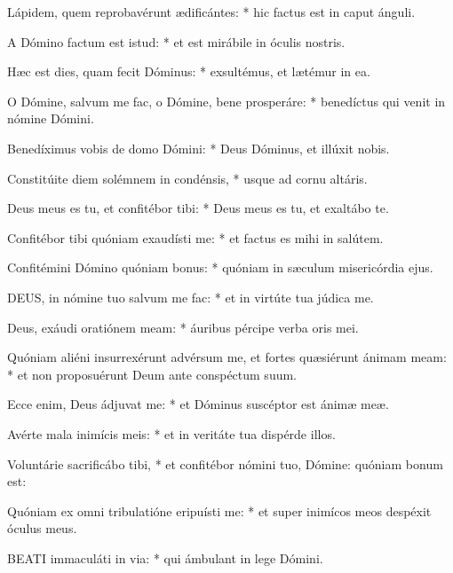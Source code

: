 Lápidem, quem reprobavérunt ædificántes: * hic factus est in caput ánguli.

A Dómino factum est istud: * et est mirábile in óculis nostris.

Hæc est dies, quam fecit Dóminus: * exsultémus, et lætémur in ea.

O Dómine, salvum me fac, o Dómine, bene prosperáre: * benedíctus qui venit in nómine Dómini.

Benedíximus vobis de domo Dómini: * Deus Dóminus, et illúxit nobis.

Constitúite diem solémnem in condénsis, * usque ad cornu altáris.

Deus meus es tu, et confitébor tibi: * Deus meus es tu, et exaltábo te.

Confitébor tibi quóniam exaudísti me: * et factus es mihi in salútem.

Confitémini Dómino quóniam bonus: * quóniam in sæculum misericórdia ejus.



\lettrine[lines=2]{D}{EUS}, in nómine tuo salvum me fac: * et in virtúte tua júdica me.

Deus, exáudi oratiónem meam: * áuribus pércipe verba oris mei.

Quóniam aliéni insurrexérunt advérsum me, et fortes quæsiérunt ánimam meam: * et non proposuérunt Deum ante conspéctum suum.

Ecce enim, Deus ádjuvat me: * et Dóminus suscéptor est ánimæ meæ.

Avérte mala inimícis meis: * et in veritáte tua dispérde illos.

Voluntárie sacrificábo tibi, * et confitébor nómini tuo, Dómine: quóniam bonum est:

Quóniam ex omni tribulatióne eripuísti me: * et super inimícos meos despéxit óculus meus.


\lettrine[lines=2]{B}{EATI} immaculáti in via: * qui ámbulant in lege Dómini.

